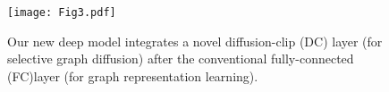 \documentclass{article}
\begin{document}






\begin{figure}
  \centering
  {\texttt{[image: Fig3.pdf]}}
  \vspace{-0.5em}
  \caption{\small Our new deep model integrates a novel diffusion-clip (DC) layer (for selective graph diffusion) after the conventional fully-connected (FC)layer (for graph representation learning).}
  \label{gcn_clip}
 \vspace{-2.0em}
\end{figure}
\end{document}
